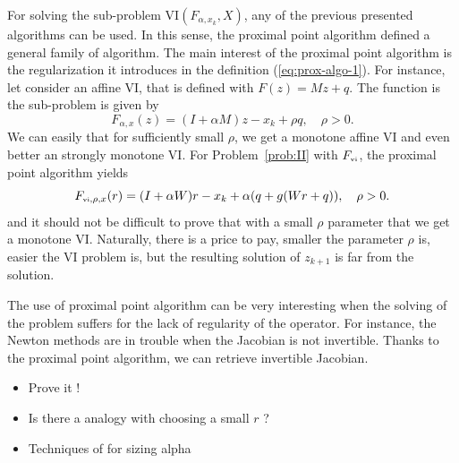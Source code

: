 For solving the sub-problem $\mathrm{VI}(F_{\alpha,x_k},X)$, any of the previous presented algorithms can be used. In this sense, the proximal point algorithm defined a general family of algorithm. The main interest of the proximal point algorithm is the regularization it introduces in the  definition (\ref{eq:prox-algo-1}). For instance, let consider an affine VI, that is defined with $F(z)=M z+q$. The function is the sub-problem is given by
\begin{equation}
  \label{eq:prox-algo-4}
   F_{\alpha,x}(z) = (I + \alpha M) z - x_k + \rho q , \quad \rho > 0 .
\end{equation}
We can easily that for sufficiently small $\rho$, we get a monotone affine VI and even better an strongly monotone VI. For Problem~\ref{prob:II} with $F_{{\hbox{\tiny{vi}}}}$, the proximal point algorithm yields
\begin{equation}
  \label{eq:prox-algo-5}
   F_{\vitwo,\rho,x}(r) = (I + \alpha W) r - x_k + \alpha( q + g(W r +q )) , \quad \rho > 0 .
\end{equation}
and it should not be difficult to prove that with a small $\rho$ parameter that we get a monotone VI.  Naturally, there is a price to pay, smaller the parameter $\rho$ is, easier the VI problem is, but the resulting solution of $z_{k+1}$ is far from the solution.

The use of proximal point algorithm can be very interesting when the solving of the problem suffers for the lack of regularity of the operator. For instance, the Newton methods are in trouble when the Jacobian is not invertible. Thanks to the proximal point algorithm, we can retrieve invertible Jacobian.


\begin{ndrva}
  \begin{itemize}
  \item Prove it !
  \item Is there a analogy with choosing a small $r$ ?
  \item Techniques of \citep{Han_JCAM2008} for sizing alpha
  \end{itemize}
\end{ndrva}


